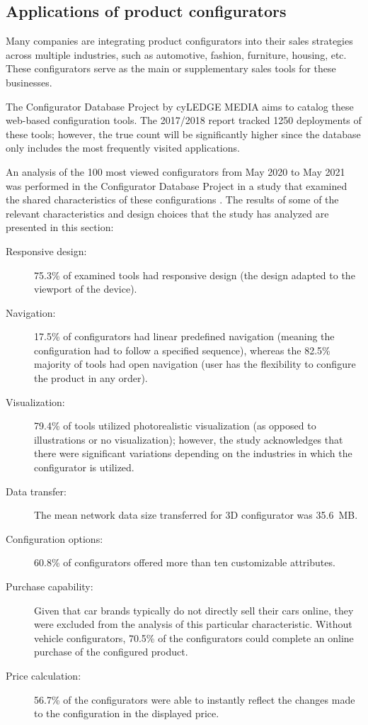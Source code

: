 \subsection{Applications of product configurators}

Many companies are integrating product configurators into their sales strategies across multiple industries, such as automotive, fashion, furniture, housing, etc. These configurators serve as the main or supplementary sales tools for these businesses.

The Configurator Database Project by cyLEDGE MEDIA aims to catalog these web-based configuration tools. The 2017/2018 report tracked 1250 deployments of these tools; however, the true count will be significantly higher since the database only includes the most frequently visited applications. \cite{cyLEDGE2018}

An analysis of the 100 most viewed configurators  from May 2020 to May 2021 was performed in the Configurator Database Project in a study that examined the shared characteristics of these configurations \cite{Blazek2023}. The results of some of the relevant characteristics and design choices that the study has analyzed are presented in this section:
\begin{description}
    \item[Responsive design:] 75.3\% of examined tools had responsive design (the design adapted to the viewport of the device).
    \item[Navigation:] 17.5\% of configurators had linear predefined navigation (meaning the configuration had to follow a specified sequence), whereas the 82.5\% majority of tools had open navigation (user has the flexibility to configure the product in any order).
    \item[Visualization:] 79.4\% of tools utilized photorealistic visualization (as opposed to illustrations or no visualization); however, the study acknowledges that there were significant variations depending on the industries in which the configurator is utilized.
    \item[Data transfer:] The mean network data size transferred for 3D configurator was 35.6~MB.
    \item[Configuration options:] 60.8\% of configurators offered more than ten customizable attributes.
    \item[Purchase capability:] Given that car brands typically do not directly sell their cars online, they were excluded from the analysis of this particular characteristic. Without vehicle configurators, 70.5\% of the configurators could complete an online purchase of the configured product.
    \item[Price calculation:] 56.7\% of the configurators were able to instantly reflect the changes made to the configuration in the displayed price.
\end{description}

